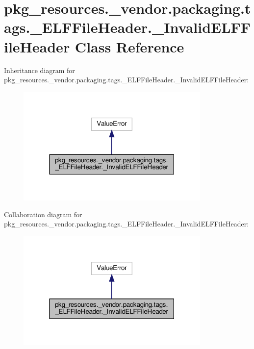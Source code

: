 \hypertarget{classpkg__resources_1_1__vendor_1_1packaging_1_1tags_1_1__ELFFileHeader_1_1__InvalidELFFileHeader}{}\section{pkg\+\_\+resources.\+\_\+vendor.\+packaging.\+tags.\+\_\+\+E\+L\+F\+File\+Header.\+\_\+\+Invalid\+E\+L\+F\+File\+Header Class Reference}
\label{classpkg__resources_1_1__vendor_1_1packaging_1_1tags_1_1__ELFFileHeader_1_1__InvalidELFFileHeader}


Inheritance diagram for pkg\+\_\+resources.\+\_\+vendor.\+packaging.\+tags.\+\_\+\+E\+L\+F\+File\+Header.\+\_\+\+Invalid\+E\+L\+F\+File\+Header\+:
\nopagebreak
\begin{figure}[H]
\begin{center}
\leavevmode
\includegraphics[width=270pt]{classpkg__resources_1_1__vendor_1_1packaging_1_1tags_1_1__ELFFileHeader_1_1__InvalidELFFileHeader__inherit__graph}
\end{center}
\end{figure}


Collaboration diagram for pkg\+\_\+resources.\+\_\+vendor.\+packaging.\+tags.\+\_\+\+E\+L\+F\+File\+Header.\+\_\+\+Invalid\+E\+L\+F\+File\+Header\+:
\nopagebreak
\begin{figure}[H]
\begin{center}
\leavevmode
\includegraphics[width=270pt]{classpkg__resources_1_1__vendor_1_1packaging_1_1tags_1_1__ELFFileHeader_1_1__InvalidELFFileHeader__coll__graph}
\end{center}
\end{figure}


